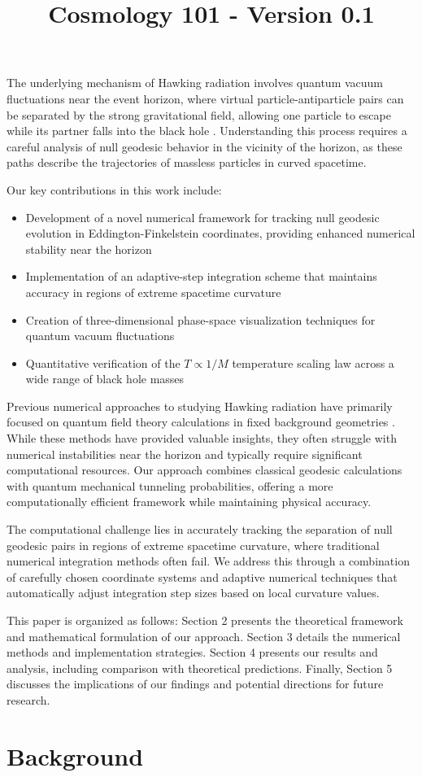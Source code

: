 \documentclass{article}\usepackage{graphicx} \usepackage{amsmath} \usepackage{colortbl}\title{Cosmology 101 - Version 0.1}
\begin{document}
The underlying mechanism of Hawking radiation involves quantum vacuum fluctuations near the event horizon, where virtual particle-antiparticle pairs can be separated by the strong gravitational field, allowing one particle to escape while its partner falls into the black hole \cite{unruh1976notes}. Understanding this process requires a careful analysis of null geodesic behavior in the vicinity of the horizon, as these paths describe the trajectories of massless particles in curved spacetime.

Our key contributions in this work include:
\begin{itemize}
\item Development of a novel numerical framework for tracking null geodesic evolution in Eddington-Finkelstein coordinates, providing enhanced numerical stability near the horizon
\item Implementation of an adaptive-step integration scheme that maintains accuracy in regions of extreme spacetime curvature
\item Creation of three-dimensional phase-space visualization techniques for quantum vacuum fluctuations
\item Quantitative verification of the $T \propto 1/M$ temperature scaling law across a wide range of black hole masses
\end{itemize}

Previous numerical approaches to studying Hawking radiation have primarily focused on quantum field theory calculations in fixed background geometries \cite{birrell1984quantum}. While these methods have provided valuable insights, they often struggle with numerical instabilities near the horizon and typically require significant computational resources. Our approach combines classical geodesic calculations with quantum mechanical tunneling probabilities, offering a more computationally efficient framework while maintaining physical accuracy.

The computational challenge lies in accurately tracking the separation of null geodesic pairs in regions of extreme spacetime curvature, where traditional numerical integration methods often fail. We address this through a combination of carefully chosen coordinate systems and adaptive numerical techniques that automatically adjust integration step sizes based on local curvature values.

This paper is organized as follows: Section 2 presents the theoretical framework and mathematical formulation of our approach. Section 3 details the numerical methods and implementation strategies. Section 4 presents our results and analysis, including comparison with theoretical predictions. Finally, Section 5 discusses the implications of our findings and potential directions for future research.\section{Background}
\end{document}
